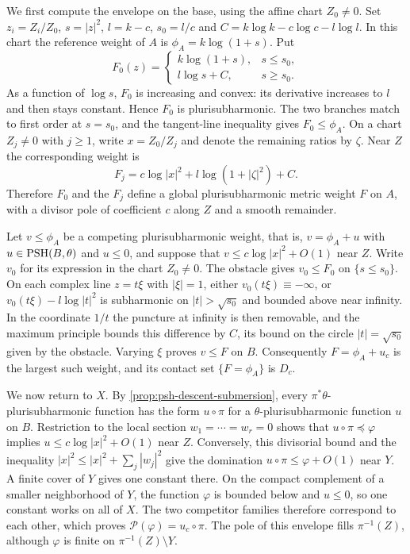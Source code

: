 We first compute the envelope on the base, using the affine chart $Z_0\ne0$. Set $z_i=Z_i/Z_0$, $s=|z|^2$, $l=k-c$, $s_0=l/c$ and
$C=k\log k-c\log c-l\log l$. In this chart the reference weight of $A$ is $\phi_A=k\log(1+s)$. Put
\[
 F_0(z)=
 \begin{cases}
 k\log(1+s),&s\leq s_0,\\
 l\log s+C,&s\geq s_0.
 \end{cases}
\]
As a function of $\log s$, $F_0$ is increasing and convex: its derivative increases to $l$ and then stays constant. Hence $F_0$ is plurisubharmonic. The two branches match to first order at $s=s_0$, and the tangent-line inequality gives $F_0\leq\phi_A$.
On a chart $Z_j\ne0$ with $j\geq1$, write $x=Z_0/Z_j$ and denote the remaining ratios by $\zeta$. Near $Z$ the corresponding weight is
\[
 F_j=c\log|x|^2+l\log(1+|\zeta|^2)+C.
\]
Therefore $F_0$ and the $F_j$ define a global plurisubharmonic metric weight $F$ on $A$, with a divisor pole of coefficient $c$ along $Z$ and a smooth remainder.

Let $v\leq\phi_A$ be a competing plurisubharmonic weight, that is, $v=\phi_A+u$ with $u\in\mathrm{PSH}(B,\theta)$ and $u\leq0$, and suppose that $v\leq c\log|x|^2+O(1)$ near $Z$. Write $v_0$ for its expression in the chart $Z_0\neq0$. The obstacle gives $v_0\leq F_0$ on $\{s\leq s_0\}$. On each complex line $z=t\xi$ with $|\xi|=1$, either $v_0(t\xi)\equiv-\infty$, or
$v_0(t\xi)-l\log|t|^2$ is subharmonic on $|t|>\sqrt{s_0}$ and bounded above near infinity. In the coordinate $1/t$ the puncture at infinity is then removable, and the maximum principle bounds this difference by $C$, its bound on the circle $|t|=\sqrt{s_0}$ given by the obstacle. Varying $\xi$ proves $v\leq F$ on $B$. Consequently $F=\phi_A+u_c$ is the largest such weight, and its contact set $\{F=\phi_A\}$ is $D_c$.

We now return to $X$. By \cref{prop:psh-descent-submersion}, every $\pi^*\theta$-plurisubharmonic function has the form $u\circ\pi$ for a $\theta$-plurisubharmonic function $u$ on $B$. Restriction to the local section $w_1=\cdots=w_r=0$ shows that
$u\circ\pi\preceq\varphi$ implies $u\leq c\log|x|^2+O(1)$ near $Z$.
Conversely, this divisorial bound and the inequality
$|x|^2\leq|x|^2+\sum_j|w_j|^2$ give the domination $u\circ\pi\leq\varphi+O(1)$ near $Y$. A finite cover of $Y$ gives one constant there. On the compact complement of a smaller neighborhood of $Y$, the function $\varphi$ is bounded below and $u\leq0$, so one constant works on all of $X$. The two competitor families therefore correspond to each other, which proves $\mathcal P(\varphi)=u_c\circ\pi$. The pole of this envelope fills $\pi^{-1}(Z)$, although $\varphi$ is finite on $\pi^{-1}(Z)\setminus Y$.


